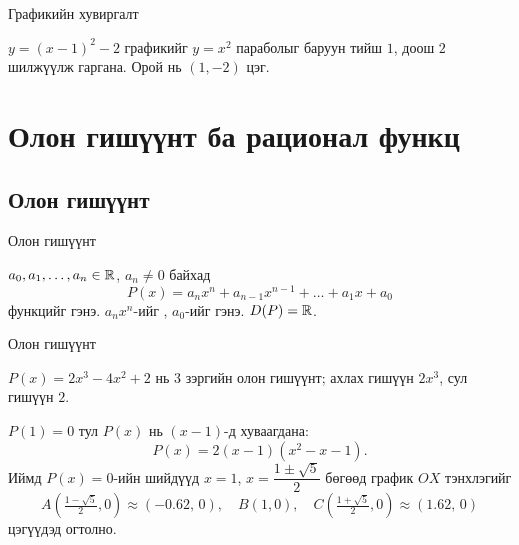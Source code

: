 \begin{frame}[allowframebreaks]{Графикийн хувиргалт}
\begin{example}
$y=(x-1)^2-2$ графикийг $y=x^2$ параболыг баруун тийш $1$, доош $2$ шилжүүлж гаргана.
Орой нь $(1,-2)$ цэг.
\end{example}
\end{frame}

\section{Олон гишүүнт ба рационал функц}
\subsection{Олон гишүүнт}
\begin{frame}[allowframebreaks]{Олон гишүүнт}
\begin{definition}
$a_0,a_1,\ldots,a_n\in\mathbb{R}$, $a_n\neq0$ байхад
\[
P(x)=a_nx^n+a_{n-1}x^{n-1}+\dots+a_1x+a_0
\]
функцийг  гэнэ. $a_nx^n$-ийг ,
$a_0$-ийг  гэнэ. $D(P)=\mathbb{R}$.
\end{definition}
\end{frame}

\begin{frame}[allowframebreaks]{Олон гишүүнт}
\begin{example}
$P(x)=2x^3-4x^2+2$ нь 3 зэргийн олон гишүүнт; ахлах гишүүн $2x^3$, сул гишүүн $2$.

$P(1)=0$ тул $P(x)$ нь $(x-1)$-д хуваагдана:
\[
P(x)=2(x-1)(x^2-x-1).
\]
Иймд $P(x)=0$-ийн шийдүүд $x=1$, $x=\dfrac{1\pm\sqrt5}{2}$ бөгөөд график $OX$ тэнхлэгийг
\[
A\!\left(\tfrac{1-\sqrt5}{2},0\right)\approx(-0.62,\,0),\quad B(1,0),\quad
C\!\left(\tfrac{1+\sqrt5}{2},0\right)\approx(1.62,\,0)
\]
цэгүүдэд огтолно.
\begin{center}
\begin{fitbox}\end{fitbox}
\end{center}
\end{example}
\end{frame}

